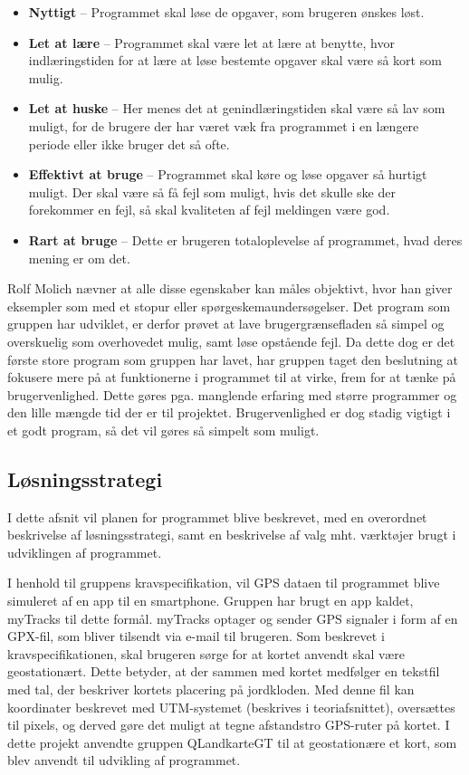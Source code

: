 \begin{itemize}
	\item \textbf{Nyttigt} – Programmet skal løse de opgaver, som brugeren ønskes løst. 
	\item \textbf{Let at lære} – Programmet skal være let at lære at benytte, hvor indlæringstiden for at lære at løse bestemte opgaver skal være så kort som mulig.
	\item \textbf{Let at huske} – Her menes det at genindlæringstiden skal være så lav som muligt, for de brugere der har været væk fra programmet i en længere periode eller ikke bruger det så ofte. 
	\item \textbf{Effektivt at bruge} – Programmet skal køre og løse opgaver så hurtigt muligt. Der skal være så få fejl som muligt, hvis det skulle ske der forekommer en fejl, så skal kvaliteten af fejl meldingen være god.
	\item \textbf{Rart at bruge} – Dette er brugeren totaloplevelse af programmet, hvad deres mening er om det.
\end{itemize}

Rolf Molich nævner at alle disse egenskaber kan måles objektivt, hvor han giver eksempler som med et stopur eller spørgeskemaundersøgelser. Det program som gruppen har udviklet, er derfor prøvet at lave brugergrænsefladen så simpel og overskuelig som overhovedet mulig, samt løse opstående fejl. Da dette dog er det første store program som gruppen har lavet, har gruppen taget den beslutning at fokusere mere på at funktionerne i programmet til at virke, frem for at tænke på brugervenlighed.  Dette gøres pga. manglende erfaring med større programmer og den lille mængde tid der er til projektet. Brugervenlighed er dog stadig vigtigt i et godt program, så det vil gøres så simpelt som muligt. 

\subsection{Løsningsstrategi}
I dette afsnit vil planen for programmet blive beskrevet, med en overordnet beskrivelse af løsningsstrategi, samt en beskrivelse af valg mht. værktøjer brugt i udviklingen af programmet.

I henhold til gruppens kravspecifikation, vil GPS dataen til programmet blive simuleret af en app til en smartphone. Gruppen har brugt en app kaldet, myTracks til dette formål. myTracks optager og sender GPS signaler i form af en GPX-fil, som bliver tilsendt via e-mail til brugeren.
Som beskrevet i kravspecifikationen, skal brugeren sørge for at kortet anvendt skal være geostationært. Dette betyder, at der sammen med kortet medfølger en tekstfil med tal, der beskriver kortets placering på jordkloden. Med denne fil kan koordinater beskrevet med UTM-systemet (beskrives i teoriafsnittet), oversættes til pixels, og derved gøre det muligt at tegne afstandstro GPS-ruter på kortet. I dette projekt anvendte gruppen QLandkarteGT til at geostationære et kort, som blev anvendt til udvikling af programmet.

